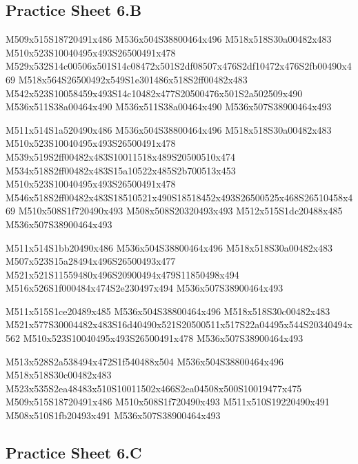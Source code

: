 \documentclass{article}
\begin{document}
\subsection{Practice Sheet 6.B}

\begin{multicols}{5}
\begin{center}

M509x515S18720491x486 %
M536x504S38800464x496 %
M518x518S30a00482x483 %
M510x523S10040495x493S26500491x478 %
M529x532S14c00506x501S14c08472x501S2df08507x476S2df10472x476S2fb00490x469 %
M518x564S26500492x549S1e301486x518S2ff00482x483 %
M542x523S10058459x493S14c10482x477S20500476x501S2a502509x490 %
M536x511S38a00464x490 %
M536x511S38a00464x490 %
M536x507S38900464x493 %
\vfil
\columnbreak

M511x514S1a520490x486 %
M536x504S38800464x496 %
M518x518S30a00482x483 %
M510x523S10040495x493S26500491x478 %
M539x519S2ff00482x483S10011518x489S20500510x474 %
M534x518S2ff00482x483S15a10522x485S2b700513x453 %
M510x523S10040495x493S26500491x478 %
M546x518S2ff00482x483S18510521x490S18518452x493S26500525x468S26510458x469 %
M510x508S1f720490x493 %
M508x508S20320493x493 %
M512x515S1dc20488x485 %
M536x507S38900464x493 %
\vfil
\columnbreak

M511x514S1bb20490x486 %
M536x504S38800464x496 %
M518x518S30a00482x483 %
M507x523S15a28494x496S26500493x477 %
M521x521S11559480x496S20900494x479S11850498x494 %
M516x526S1f000484x474S2e230497x494 %
M536x507S38900464x493 %
\vfil
\columnbreak

M511x515S1ce20489x485 %
M536x504S38800464x496 %
M518x518S30c00482x483 %
M521x577S30004482x483S16d40490x521S20500511x517S22a04495x544S20340494x562 %
M510x523S10040495x493S26500491x478 %
M536x507S38900464x493 %
\vfil
\columnbreak

M513x528S2a538494x472S1f540488x504 %
M536x504S38800464x496 %
M518x518S30c00482x483 %
M523x535S2ea48483x510S10011502x466S2ea04508x500S10019477x475 %
M509x515S18720491x486 %
M510x508S1f720490x493 %
M511x510S19220490x491 %
M508x510S1fb20493x491 %
M536x507S38900464x493 %
\vfil

\end{center}
\end{multicols}

\subsection{Practice Sheet 6.C}
\end{document}

